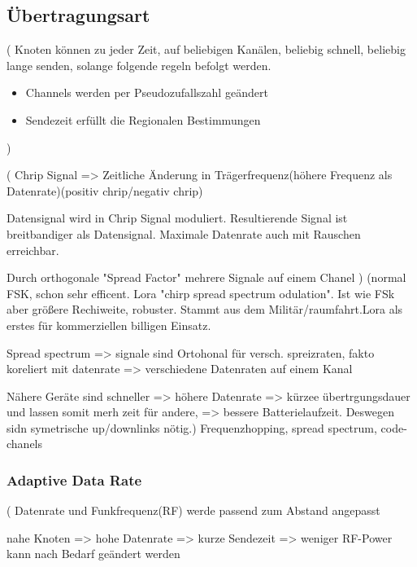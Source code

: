 \documentclass[a4paper,12pt]{article}
\begin{document}
        \subsection{Übertragungsart}
            \cite{LoRaSpec}(
                Knoten können zu jeder Zeit, auf beliebigen Kanälen, beliebig schnell, beliebig lange senden, solange folgende regeln befolgt werden.
                \begin{itemize}
                    
                        \item Channels werden per Pseudozufallszahl geändert
                        \item Sendezeit erfüllt die Regionalen Bestimmungen
                    
                \end{itemize}
            )

            \cite{LoraLimit}(
                Chrip Signal => Zeitliche Änderung in Trägerfrequenz(höhere Frequenz als Datenrate)(positiv chrip/negativ chrip)

                Datensignal wird in Chrip Signal moduliert. Resultierende Signal ist breitbandiger als Datensignal. Maximale Datenrate auch mit Rauschen erreichbar.

                Durch orthogonale "Spread Factor" mehrere Signale auf einem Chanel
            )
            \cite{WhatIsLoRa}(normal FSK, schon sehr efficent. Lora "chirp spread spectrum odulation". Ist wie FSk aber größere Rechiweite, robuster. Stammt aus dem Militär/raumfahrt.Lora als erstes für kommerziellen billigen Einsatz.
            
            Spread spectrum => signale sind Ortohonal für versch. spreizraten, fakto koreliert mit datenrate => verschiedene Datenraten auf einem Kanal
            
            Nähere Geräte sind schneller => höhere Datenrate => kürzee übertrgungsdauer und lassen somit merh zeit für andere, => bessere Batterielaufzeit. Deswegen sidn symetrische up/downlinks nötig.)
            Frequenzhopping, spread spectrum, code-chanels
                \subsubsection{Adaptive Data Rate}
                \cite{LoraLimit}(
                    Datenrate und Funkfrequenz(RF) werde passend zum Abstand angepasst

                    nahe Knoten => hohe Datenrate => kurze Sendezeit => weniger RF-Power
                    kann nach Bedarf geändert werden
\end{document}
